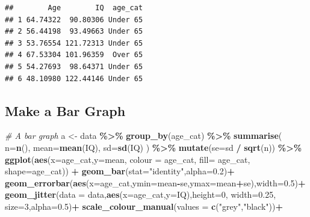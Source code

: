 \documentclass[
]{book}
\newenvironment{Shaded}{\begin{snugshade}}{\end{snugshade}}
\newcommand{\AttributeTok}[1]{\textcolor[rgb]{0.13,0.29,0.53}{#1}}
\newcommand{\CommentTok}[1]{\textcolor[rgb]{0.56,0.35,0.01}{\textit{#1}}}
\newcommand{\DecValTok}[1]{\textcolor[rgb]{0.00,0.00,0.81}{#1}}
\newcommand{\FloatTok}[1]{\textcolor[rgb]{0.00,0.00,0.81}{#1}}
\newcommand{\FunctionTok}[1]{\textcolor[rgb]{0.13,0.29,0.53}{\textbf{#1}}}
\newcommand{\NormalTok}[1]{#1}
\newcommand{\OtherTok}[1]{\textcolor[rgb]{0.56,0.35,0.01}{#1}}
\newcommand{\SpecialCharTok}[1]{\textcolor[rgb]{0.81,0.36,0.00}{\textbf{#1}}}
\newcommand{\StringTok}[1]{\textcolor[rgb]{0.31,0.60,0.02}{#1}}
\begin{document}
\begin{verbatim}
##        Age        IQ  age_cat
## 1 64.74322  90.80306 Under 65
## 2 56.44198  93.49663 Under 65
## 3 53.76554 121.72313 Under 65
## 4 67.53304 101.96359  Over 65
## 5 54.27693  98.64371 Under 65
## 6 48.10980 122.44146 Under 65
\end{verbatim}

\subsection*{Make a Bar Graph}\label{make-a-bar-graph}

\begin{Shaded}
\begin{Highlighting}[]
\CommentTok{\# A bar graph}
\NormalTok{a }\OtherTok{\textless{}{-}}\NormalTok{ data }\SpecialCharTok{\%\textgreater{}\%}
  \FunctionTok{group\_by}\NormalTok{(age\_cat) }\SpecialCharTok{\%\textgreater{}\%}
  \FunctionTok{summarise}\NormalTok{(}
    \AttributeTok{n=}\FunctionTok{n}\NormalTok{(),}
    \AttributeTok{mean=}\FunctionTok{mean}\NormalTok{(IQ),}
    \AttributeTok{sd=}\FunctionTok{sd}\NormalTok{(IQ)}
\NormalTok{  ) }\SpecialCharTok{\%\textgreater{}\%} \FunctionTok{mutate}\NormalTok{(}\AttributeTok{se=}\NormalTok{sd }\SpecialCharTok{/} \FunctionTok{sqrt}\NormalTok{(n)) }\SpecialCharTok{\%\textgreater{}\%}
  \FunctionTok{ggplot}\NormalTok{(}\FunctionTok{aes}\NormalTok{(}\AttributeTok{x=}\NormalTok{age\_cat,}\AttributeTok{y=}\NormalTok{mean, }\AttributeTok{colour =}\NormalTok{ age\_cat, }\AttributeTok{fill=}\NormalTok{ age\_cat, }\AttributeTok{shape=}\NormalTok{age\_cat)) }\SpecialCharTok{+}
  \FunctionTok{geom\_bar}\NormalTok{(}\AttributeTok{stat=}\StringTok{"identity"}\NormalTok{,}\AttributeTok{alpha=}\FloatTok{0.2}\NormalTok{)}\SpecialCharTok{+}
  \FunctionTok{geom\_errorbar}\NormalTok{(}\FunctionTok{aes}\NormalTok{(}\AttributeTok{x=}\NormalTok{age\_cat,}\AttributeTok{ymin=}\NormalTok{mean}\SpecialCharTok{{-}}\NormalTok{se,}\AttributeTok{ymax=}\NormalTok{mean}\SpecialCharTok{+}\NormalTok{se),}\AttributeTok{width=}\FloatTok{0.5}\NormalTok{)}\SpecialCharTok{+}
  \FunctionTok{geom\_jitter}\NormalTok{(}\AttributeTok{data =}\NormalTok{ data,}\FunctionTok{aes}\NormalTok{(}\AttributeTok{x=}\NormalTok{age\_cat,}\AttributeTok{y=}\NormalTok{IQ),}\AttributeTok{height=}\DecValTok{0}\NormalTok{, }\AttributeTok{width=}\FloatTok{0.25}\NormalTok{, }\AttributeTok{size=}\DecValTok{3}\NormalTok{,}\AttributeTok{alpha=}\FloatTok{0.5}\NormalTok{)}\SpecialCharTok{+}
  \FunctionTok{scale\_colour\_manual}\NormalTok{(}\AttributeTok{values =} \FunctionTok{c}\NormalTok{(}\StringTok{"grey"}\NormalTok{,}\StringTok{"black"}\NormalTok{))}\SpecialCharTok{+}

\end{Highlighting}
\end{Shaded}
\end{document}
